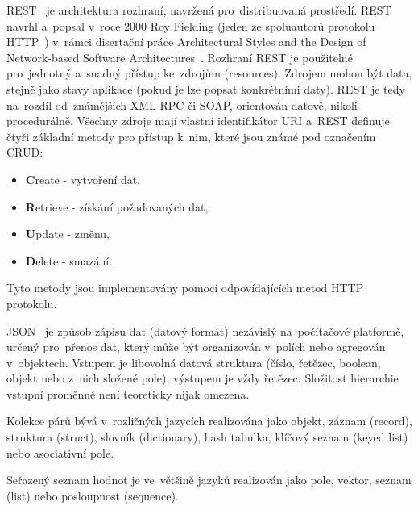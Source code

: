 REST~\cite{rest} je architektura rozhraní, navržená pro~distribuovaná prostředí. REST navrhl a~popsal v~roce 2000 Roy Fielding (jeden ze spoluautorů protokolu HTTP~\cite{http}) v~rámci disertační práce Architectural Styles and the Design of Network-based Software Architectures~\cite{rest-publication}. Rozhraní REST je použitelné pro~jednotný a~snadný přístup ke~zdrojům (resources). Zdrojem mohou být data, stejně jako stavy aplikace (pokud je lze popsat konkrétními daty). REST je tedy na~rozdíl od~známějších XML-RPC či SOAP, orientován datově, nikoli procedurálně. Všechny zdroje mají vlastní identifikátor URI a~REST definuje čtyři základní metody pro přístup k~nim, které jsou známé pod označením CRUD:
\begin{itemize}
	\setlength{\parskip}{0pt}
	\setlength{\itemsep}{0pt}
	\item {\textbf{C}reate - vytvoření dat,}
	\item {\textbf{R}etrieve - získání požadovaných dat,}
	\item {\textbf{U}pdate - změnu,}
	\item {\textbf{D}elete - smazání.}
\end{itemize} 
Tyto metody jsou implementovány pomocí odpovídajících metod HTTP protokolu.

JSON~\cite{json} je způsob zápisu dat (datový formát) nezávislý na~počítačové platformě, určený pro~přenos dat, který může být organizován v~polích nebo agregován v~objektech. Vstupem je libovolná datová struktura (číslo, řetězec, boolean, objekt nebo z~nich složené pole), výstupem je vždy řetězec. Složitost hierarchie vstupní proměnné není teoreticky nijak omezena. 

Kolekce párů  bývá v~rozličných jazycích realizována jako objekt, záznam (record), struktura (struct), slovník (dictionary), hash tabulka, klíčový seznam (keyed list) nebo asociativní pole.

Seřazený seznam hodnot je ve~většině jazyků realizován jako pole, vektor, seznam (list) nebo posloupnost (sequence).

